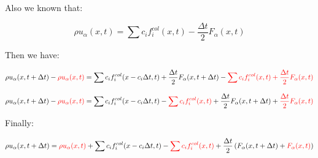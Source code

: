 Also we known that:

\begin{equation}
	\rho u_\alpha(x,t) = \sum{c_i{f}_i^{col}(x,t)} - \frac{\Delta t}{2}F_\alpha(x,t)
\end{equation}

Then we have:

\begin{equation}
	\rho u_\alpha(x,t+\Delta t) -\textcolor{red}{\rho u_\alpha(x,t)}= \sum{c_i f_i^{col}(x-c_i\Delta t, t)} + \frac{\Delta t}{2}F_\alpha(x,t+\Delta t) -\textcolor{red}{\sum{c_i{f}_i^{col}(x,t)} + \frac{\Delta t}{2}F_\alpha(x,t)}
\end{equation}

\begin{equation}
	\rho u_\alpha(x,t+\Delta t) -\textcolor{red}{\rho u_\alpha(x,t)}= \sum{c_i f_i^{col}(x-c_i\Delta t, t)} -\textcolor{red}{\sum{c_i{f}_i^{col}(x,t)}}+ \frac{\Delta t}{2}F_\alpha(x,t+\Delta t) + \textcolor{red}{\frac{\Delta t}{2}F_\alpha(x,t)}
\end{equation}

Finally:

\begin{equation}
	\rho u_\alpha(x,t+\Delta t) =\textcolor{red}{\rho u_\alpha(x,t)} + \sum{c_i f_i^{col}(x-c_i\Delta t, t)} -\textcolor{red}{\sum{c_i{f}_i^{col}(x,t)}}+ \frac{\Delta t}{2}\left(F_\alpha(x,t+\Delta t) + \textcolor{red}{{F_\alpha(x,t)}}\right)
\end{equation}